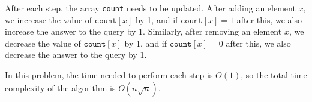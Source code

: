 After each step, the array \texttt{count}
needs to be updated.
After adding an element $x$,
we increase the value of 
$\texttt{count}[x]$ by 1,
and if $\texttt{count}[x]=1$ after this,
we also increase the answer to the query by 1.
Similarly, after removing an element $x$,
we decrease the value of 
$\texttt{count}[x]$ by 1,
and if $\texttt{count}[x]=0$ after this,
we also decrease the answer to the query by 1.

In this problem, the time needed to perform
each step is $O(1)$, so the total time complexity
of the algorithm is $O(n \sqrt n)$.